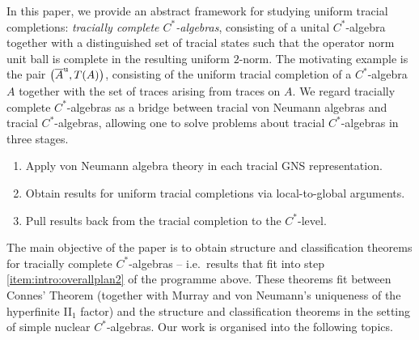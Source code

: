 \documentclass[a4paper,11pt]{amsart}
\theoremstyle{definition}
\numberwithin{equation}{section}
\numberwithin{theorem}{section}
\newcommand{\completion}[2]{\overline{#1}^{#2}}
\begin{document}
In this paper, we provide an abstract framework for studying uniform tracial completions:  \emph{tracially complete $C^*$-algebras}, consisting of a unital $C^*$-algebra together with a distinguished set of tracial states such that the operator norm unit ball is complete in the resulting uniform $2$-norm. The motivating example is the pair $\big(\completion{A}{\rm u}, T(A)\big)$, consisting of the uniform tracial completion of a $C^*$-algebra $A$ together with the set of traces arising from traces on $A$. We regard tracially complete $C^*$-algebras as a bridge between tracial von Neumann algebras and tracial $C^*$-algebras, allowing one to solve problems about tracial $C^*$-algebras in three stages.
\begin{enumerate}
\item Apply von Neumann algebra theory in each tracial GNS representation.\label{item:intro:overallplan1}
\item Obtain results for uniform tracial completions  via local-to-global arguments.\label{item:intro:overallplan2}
\item Pull results back from the tracial completion to the $C^*$-level.\label{item:intro:overallplan3}
\end{enumerate}

The main objective of the paper is to obtain structure and classification theorems for tracially complete $C^*$-algebras -- i.e.\ results that fit into step \ref{item:intro:overallplan2} of the programme above. These theorems fit between Connes' Theorem (together with Murray and von Neumann's uniqueness of the hyperfinite II$_1$ factor) and the structure and classification theorems in the setting of simple nuclear $C^*$-algebras.  Our work is organised into the following topics.
\end{document}
